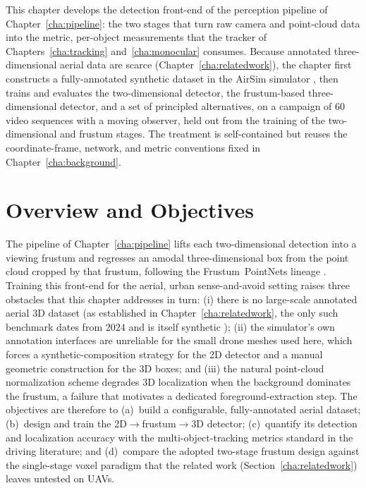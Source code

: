 
This chapter develops the detection front-end of the perception pipeline of
Chapter~\ref{cha:pipeline}: the two stages that turn raw camera and point-cloud
data into the metric, per-object measurements that the tracker of
Chapters~\ref{cha:tracking} and~\ref{cha:monocular} consumes. Because annotated
three-dimensional aerial data are scarce (Chapter~\ref{cha:relatedwork}), the
chapter first constructs a fully-annotated synthetic dataset in the AirSim
simulator \cite{shah2018airsim}, then trains and evaluates the
two-dimensional detector, the frustum-based three-dimensional detector, and a set
of principled alternatives, on a campaign of $60$ video sequences with a moving
observer, held out from the training of the two-dimensional and frustum stages. The treatment is self-contained but reuses the coordinate-frame,
network, and metric conventions fixed in Chapter~\ref{cha:background}.

\section{Overview and Objectives}

The pipeline of Chapter~\ref{cha:pipeline} lifts each two-dimensional detection
into a viewing frustum and regresses an amodal three-dimensional box from the
point cloud cropped by that frustum, following the Frustum~PointNets lineage
\cite{qi2018frustum,qi2017pointnetpp}. Training this front-end for the aerial,
urban sense-and-avoid setting raises three obstacles that this chapter
addresses in turn: (i) there is no large-scale annotated aerial 3D dataset
(as established in Chapter~\ref{cha:relatedwork}, the only such benchmark dates
from $2024$ and is itself synthetic \cite{ye2024uav3d}); (ii) the simulator's own
annotation interfaces are unreliable for the small drone meshes used here, which
forces a synthetic-composition strategy for the 2D detector and a manual
geometric construction for the 3D boxes; and (iii) the natural point-cloud
normalization scheme degrades 3D localization when the background dominates the
frustum, a failure that motivates a dedicated foreground-extraction step. The
objectives are therefore to (a)~build a configurable, fully-annotated aerial
dataset; (b)~design and train the 2D$\rightarrow$frustum$\rightarrow$3D detector;
(c)~quantify its detection and localization accuracy with the
multi-object-tracking metrics standard in the driving literature; and (d)~compare
the adopted two-stage frustum design against the single-stage voxel paradigm that
the related work (Section~\ref{cha:relatedwork}) leaves untested on UAVs.

